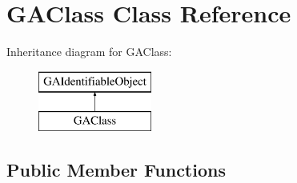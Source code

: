 \hypertarget{class_g_a_class}{}\section{G\+A\+Class Class Reference}
\label{class_g_a_class}
Inheritance diagram for G\+A\+Class\+:\begin{figure}[H]
\begin{center}
\leavevmode
\includegraphics[height=2.000000cm]{class_g_a_class}
\end{center}
\end{figure}
\subsection*{Public Member Functions}
